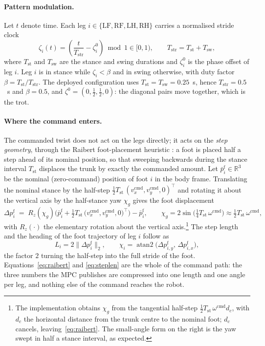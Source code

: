 \documentclass[11pt,a4paper]{article}
\newcommand{\R}{\mathbb{R}}
\newcommand{\Tstr}{T_{\mathrm{str}}}
\newcommand{\Tst}{T_{\mathrm{st}}}
\newcommand{\Tsw}{T_{\mathrm{sw}}}
\newcommand{\pf}{p^{\mathrm{f}}}
\begin{document}
\paragraph{Pattern modulation.} Let $t$ denote time. Each leg $i\in\{\mathrm{LF},\mathrm{RF},\mathrm{LH},
\mathrm{RH}\}$ carries a normalised stride clock
\begin{equation}
  \zeta_i(t)=\left(\frac{t}{\Tstr}-\zeta_i^{0}\right)\bmod 1\in[0,1),
  \qquad \Tstr=\Tst+\Tsw ,
  \label{eq:gaitphase}
\end{equation}
where $\Tst$ and $\Tsw$ are the stance and swing durations and $\zeta_i^{0}$ is the phase offset of leg $i$.
Leg $i$ is in stance while $\zeta_i<\beta$ and in swing otherwise, with duty factor $\beta=\Tst/\Tstr$. The
deployed configuration uses $\Tst=\Tsw=0.25$~s, hence $\Tstr=0.5$~s and $\beta=0.5$, and
$\zeta^{0}=(0,\tfrac12,\tfrac12,0)$: the diagonal pairs move together, which is the trot.

\paragraph{Where the command enters.} The commanded twist does not act on the legs directly; it acts on the
\emph{step geometry}, through the Raibert foot-placement heuristic \cite{raibert1986legged}: a foot is placed
half a step ahead of its nominal position, so that sweeping backwards during the stance interval $\Tst$
displaces the trunk by exactly the commanded amount. Let $\bar\pf_i\in\R^3$ be the nominal (zero-command)
position of foot $i$ in the body frame. Translating the nominal stance by the half-step
$\tfrac{1}{2}\Tst\,(v_x^{\mathrm{cmd}},v_y^{\mathrm{cmd}},0)^{\!\top}$ and rotating it about the vertical axis
by the half-stance yaw $\chi_g$ gives the foot displacement
\begin{equation}
  \Delta\pf_i \;=\; R_z(\chi_g)\Big(\bar\pf_i+\tfrac{1}{2}\Tst\,
                  \big(v_x^{\mathrm{cmd}},v_y^{\mathrm{cmd}},0\big)^{\!\top}\Big)-\bar\pf_i ,
  \qquad
  \chi_g = 2\sin\!\Big(\tfrac{1}{4}\Tst\,\omega^{\mathrm{cmd}}\Big)\approx\tfrac{1}{2}\Tst\,\omega^{\mathrm{cmd}} ,
  \label{eq:raibert}
\end{equation}
with $R_z(\cdot)$ the elementary rotation about the vertical axis.\footnote{The implementation obtains
$\chi_g$ from the tangential half-step $\tfrac12\Tst\,\omega^{\mathrm{cmd}}d_c$, with $d_c$ the horizontal
distance from the trunk centre to the nominal foot; $d_c$ cancels, leaving~\eqref{eq:raibert}. The small-angle
form on the right is the yaw swept in half a stance interval, as expected.} The step length and the heading of
the foot trajectory of leg $i$ follow as
\begin{equation}
  L_i = 2\big\|\Delta\pf_i\big\|_2 ,
  \qquad
  \chi_i=\operatorname{atan2}\big(\Delta\pf_{i,y},\,\Delta\pf_{i,x}\big),
  \label{eq:steplen}
\end{equation}
the factor $2$ turning the half-step into the full stride of the foot. Equations~\eqref{eq:raibert} and
\eqref{eq:steplen} are the whole of the command path: the three numbers the MPC publishes are compressed into
one length and one angle per leg, and nothing else of the command reaches the robot.
\end{document}
